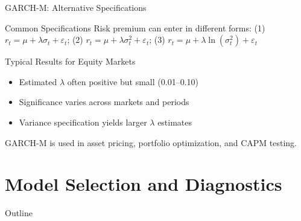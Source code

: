 \documentclass[9pt, aspectratio=169, t]{beamer}
\begin{document}
\begin{frame}{GARCH-M: Alternative Specifications}
\small
    \begin{block}{Common Specifications}
        Risk premium can enter in different forms: (1) $r_t = \mu + \lambda \sigma_t + \varepsilon_t$; (2) $r_t = \mu + \lambda \sigma_t^2 + \varepsilon_t$; (3) $r_t = \mu + \lambda \ln(\sigma_t^2) + \varepsilon_t$
    \end{block}
    \vspace{-0.1cm}
    \begin{exampleblock}{Typical Results for Equity Markets}
        \begin{itemize}
            \item Estimated $\lambda$ often positive but small (0.01--0.10)
            \item Significance varies across markets and periods
            \item Variance specification yields larger $\lambda$ estimates
        \end{itemize}
    \end{exampleblock}
    \vspace{-0.1cm}
    \begin{rmk}
        GARCH-M is used in asset pricing, portfolio optimization, and CAPM testing.
    \end{rmk}
\end{frame}

\section{Model Selection and Diagnostics}

\begin{frame}{Outline}
    \small
    \vspace{-0.2cm}
    \tableofcontents[currentsection]
\end{frame}
\end{document}
